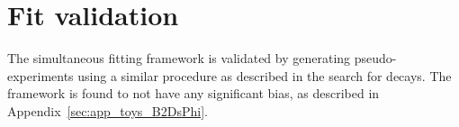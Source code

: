 

\section{Fit validation}
\label{sec:B2DsPhi_fitstrategy}
The simultaneous fitting framework is validated by generating pseudo-experiments using a similar procedure as described in the search for \decay{\Bp}{\Dsp\Kp\Km} decays. The framework is found to not have any significant bias, as described in Appendix~\ref{sec:app_toys_B2DsPhi}.


